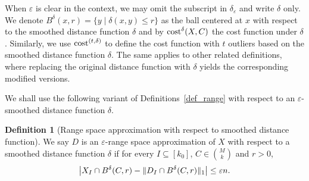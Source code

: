 \documentclass[11pt,letterpaper]{article}
\theoremstyle{definition}
\newtheorem{definition}[theorem]{Definition}
\newcommand{\eps}{\varepsilon}
\DeclareMathOperator{\dist}{dist}
\DeclarePairedDelimiter{\abs}{\lvert}{\rvert}
\DeclarePairedDelimiter{\norm}{\lVert}{\rVert}
\begin{document}
When $\eps$ is clear in the context, we may omit the subscript in $\delta_\eps$ and write $\delta$ only.
%
We denote $B^\delta(x,r)=\{y\mid \delta(x,y)\leq r\} $ as the ball centered at $x$ with respect to the smoothed distance function $\delta$ and by $\cost^{\delta}(X,C)$ the cost function under $\delta$. 
%
Similarly, we use $\cost^{(t,\delta)}$ to define the cost function with $t$ outliers based on the smoothed distance function $\delta$. 
%
The same applies to other related definitions, where replacing the original distance function with $\delta$ yields the corresponding modified versions.

%
We shall use the following variant of Definitions~\ref{def_range} with respect to an $\eps$-smoothed distance function $\delta$. 

\begin{definition}[Range space approximation with respect to smoothed distance function] \label{def:eps_smoothed_range}
    We say $D$ is an $\eps$-range space approximation of $X$ with respect to a smoothed distance function $\delta$ if for every $I\subseteq[k_0]$, $C\in \binom{M}{k}$ and $r>0$,
    \[
        \abs[\big]{ X_I\cap B^\delta (C,r) - \norm{ D_I \cap B^\delta(C,r) }_1 
        }\leq \eps n.
    \]
\end{definition}



\end{document}

